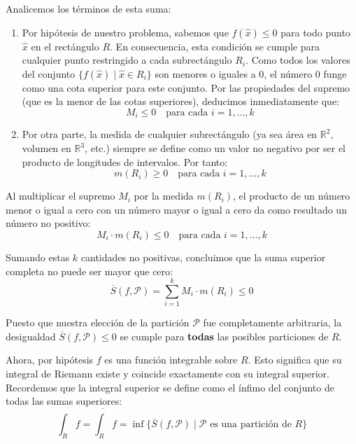 \documentclass[11pt,letterpaper]{article}
\begin{document}
Analicemos los términos de esta suma:
\begin{enumerate}
    \item Por hipótesis de nuestro problema, sabemos que $f(\hat{x}) \le 0$ para todo punto $\hat{x}$ en el rectángulo $R$. En consecuencia, esta condición se cumple para cualquier punto restringido a cada subrectángulo $R_i$. Como todos los valores del conjunto $\{ f(\hat{x}) \mid \hat{x} \in R_i \}$ son menores o iguales a $0$, el número $0$ funge como una cota superior para este conjunto. Por las propiedades del supremo (que es la menor de las cotas superiores), deducimos inmediatamente que:
    \begin{equation*}
    M_i \le 0 \quad \text{para cada } i = 1, \dots, k
    \end{equation*}
    
    \item Por otra parte, la medida de cualquier subrectángulo (ya sea área en $\mathbb{R}^2$, volumen en $\mathbb{R}^3$, etc.) siempre se define como un valor no negativo por ser el producto de longitudes de intervalos. Por tanto:
    \begin{equation*}
    m(R_i) \ge 0 \quad \text{para cada } i = 1, \dots, k
    \end{equation*}
\end{enumerate}

Al multiplicar el supremo $M_i$ por la medida $m(R_i)$, el producto de un número menor o igual a cero con un número mayor o igual a cero da como resultado un número no positivo:
\begin{equation*}
M_i \cdot m(R_i) \le 0 \quad \text{para cada } i = 1, \dots, k
\end{equation*}

Sumando estas $k$ cantidades no positivas, concluimos que la suma superior completa no puede ser mayor que cero:
\begin{equation*}
\overline{S}(f, \mathcal{P}) = \sum_{i=1}^{k} M_i \cdot m(R_i) \le 0
\end{equation*}

Puesto que nuestra elección de la partición $\mathcal{P}$ fue completamente arbitraria, la desigualdad $\overline{S}(f, \mathcal{P}) \le 0$ se cumple para \textbf{todas} las posibles particiones de $R$. 

Ahora, por hipótesis $f$ es una función integrable sobre $R$. Esto significa que su integral de Riemann existe y coincide exactamente con su integral superior. Recordemos que la integral superior se define como el ínfimo del conjunto de todas las sumas superiores:
\begin{equation*}
\int_R f = \overline{\int_R} f = \inf \{ \overline{S}(f, \mathcal{P}) \mid \mathcal{P} \text{ es una partición de } R \}
\end{equation*}
\end{document}
